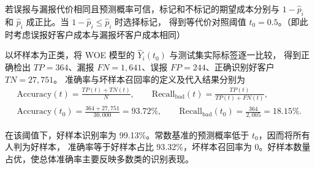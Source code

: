 若误报与漏报代价相同且预测概率可信，标记和不标记的期望成本分别与
$1-\widehat p_i$ 和 $\widehat p_i$ 成正比。当 $1-\widehat p_i\leq\widehat p_i$ 时选择标记，
得到等代价对照阈值 $t_0=0.5$。（即此时考虑误报好客户成本与漏报坏客户成本相同）

以坏样本为正类，将 WOE 模型的 $\widehat Y_i(t_0)$ 与测试集实际标签逐一比较，
得到正确检出 $TP=364$、漏报 $FN=1{,}641$、误报 $FP=244$、正确识别好客户 $TN=27{,}751$。
准确率与坏样本召回率的定义及代入结果分别为
\[
  \begin{gathered}
    \mathrm{Accuracy}(t)=\frac{TP(t)+TN(t)}{N},\qquad
    \mathrm{Recall}_{\mathrm{bad}}(t)=\frac{TP(t)}{TP(t)+FN(t)},\\[0.3ex]
    \mathrm{Accuracy}(t_0)=\frac{364+27{,}751}{30{,}000}=93.72\%,\qquad
    \mathrm{Recall}_{\mathrm{bad}}(t_0)=\frac{364}{2{,}005}=18.15\%.
  \end{gathered}
\]

在该阈值下，好样本识别率为 99.13\%。常数基准的预测概率低于 $t_0$，因而将所有人判为好样本，
准确率等于好样本占比 93.32\%，坏样本召回率为 0。好样本数量占优，使总体准确率主要反映多数类的识别表现。

\endgroup
